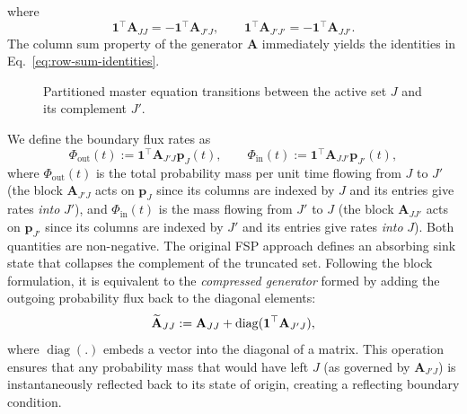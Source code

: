 \documentclass[onefignum,onetabnum]{siamart171218}
\begin{document}
where
\begin{equation}
\label{eq:row-sum-identities}
\mathbf{1}^\top \mathbf{A}_{JJ} = -\mathbf{1}^\top \mathbf{A}_{J'J}, \qquad \mathbf{1}^\top \mathbf{A}_{J'J'} = -\mathbf{1}^\top \mathbf{A}_{JJ'}.
\end{equation}
The column sum property of the generator $\mathbf{A}$ immediately yields the identities in Eq.~\eqref{eq:row-sum-identities}.
\begin{figure}[ht!]
    \centering
    \caption{Partitioned master equation transitions between the active set $J$ and its complement $J'$.}
    \label{fig:transitions}
\end{figure}


We define the boundary flux rates as
\begin{equation}
\label{eq:flux-defs}
\Phi_{\mathrm{out}}(t) := \mathbf{1}^\top \mathbf{A}_{J'J}\boldsymbol{p}_J(t), \qquad \Phi_{\mathrm{in}}(t) := \mathbf{1}^\top \mathbf{A}_{JJ'}\boldsymbol{p}_{J'}(t),
\end{equation}
where $\Phi_{\mathrm{out}}(t)$ is the total probability mass per unit time flowing from $J$ to $J'$ (the block $\mathbf{A}_{J'J}$ acts on $\boldsymbol{p}_J$ since its columns are indexed by $J$ and its entries give rates \emph{into} $J'$), and $\Phi_{\mathrm{in}}(t)$ is the mass flowing from $J'$ to $J$ (the block $\mathbf{A}_{JJ'}$ acts on $\boldsymbol{p}_{J'}$ since its columns are indexed by $J'$ and its entries give rates \emph{into} $J$). Both quantities are non-negative. The original FSP approach defines an absorbing sink state that collapses the complement of the truncated set. Following the block formulation, it is equivalent to the \textit{compressed generator} formed by adding the outgoing probability flux back to the diagonal elements:
\begin{equation}
\label{eq:compressed-generator}
\widetilde{\mathbf{A}}_{JJ} := \mathbf{A}_{JJ} + \diag(\mathbf{1}^\top \mathbf{A}_{J'J}),
\end{equation}
where $\operatorname{diag}(.)$ embeds a vector into the diagonal of a matrix. This operation ensures that any probability mass that would have left $J$ (as governed by $\mathbf{A}_{J'J}$) is instantaneously reflected back to its state of origin, creating a reflecting boundary condition.
\end{document}
